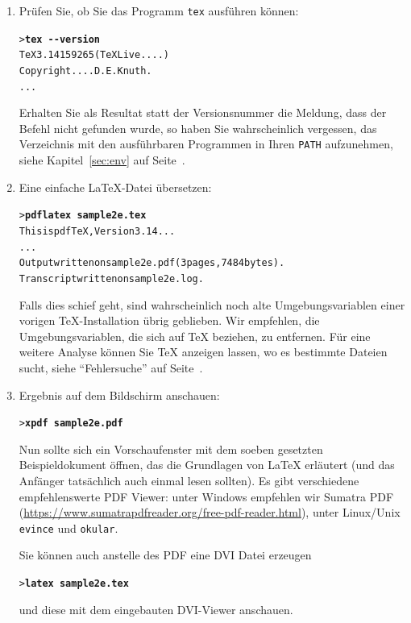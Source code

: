 \documentclass[12pt,ngerman,a4paper,fullparskip]{scrreprt}
\newcommand{\cmdname}[1]{\texttt{#1}}
\newcommand{\envname}[1]{\texttt{#1}}
\newcommand{\Ucom}[1]{\textbf{\texttt{#1}}}
\begin{document}
\begin{enumerate}

\item Prüfen Sie, ob Sie das Programm \cmdname{tex} ausführen können:

\begin{alltt}
> \Ucom{tex -{}-version}
TeX 3.14159265 (TeX Live ....)
Copyright .... D.E. Knuth.
...
\end{alltt}

Erhalten Sie als Resultat statt der Versionsnummer die Meldung, dass der Befehl nicht gefunden wurde,
so haben Sie wahrscheinlich vergessen, das Verzeichnis mit den ausführbaren Programmen
in Ihren \envname{PATH} aufzunehmen, siehe Kapitel~\ref{sec:env} auf Seite~\pageref{sec:env}.

\item Eine einfache \LaTeX{}-Datei übersetzen:
\begin{alltt}
> \Ucom{pdflatex sample2e.tex}
This is pdfTeX, Version 3.14...
...
Output written on sample2e.pdf (3 pages, 7484 bytes).
Transcript written on sample2e.log.
\end{alltt}

Falls dies schief geht, sind wahrscheinlich noch alte Umgebungsvariablen einer vorigen \TeX-Installation
übrig geblieben. Wir empfehlen, die Umgebungsvariablen, die sich auf \TeX{} beziehen, zu entfernen.
Für eine weitere Analyse können Sie \TeX{} anzeigen lassen, wo es bestimmte Dateien sucht,
siehe \enquote{Fehlersuche} auf Seite~\pageref{sec:debugging}.

\item Ergebnis auf dem Bildschirm anschauen:
\begin{alltt}
> \Ucom{xpdf sample2e.pdf}    
\end{alltt}

Nun sollte sich ein Vorschaufenster mit dem soeben gesetzten Beispieldokument öffnen, das die Grundlagen von \LaTeX{} erläutert (und das Anfänger tatsächlich auch einmal lesen sollten). Es gibt verschiedene empfehlenswerte PDF Viewer: unter Windows empfehlen wir Sumatra PDF (\url{https://www.sumatrapdfreader.org/free-pdf-reader.html}), unter Linux/Unix \cmdname{evince} und \cmdname{okular}.

Sie können auch anstelle des PDF eine DVI Datei erzeugen 

\begin{alltt}
> \Ucom{latex sample2e.tex}    
\end{alltt}

und diese mit dem eingebauten DVI-Viewer anschauen.


\end{enumerate}
\end{document}
